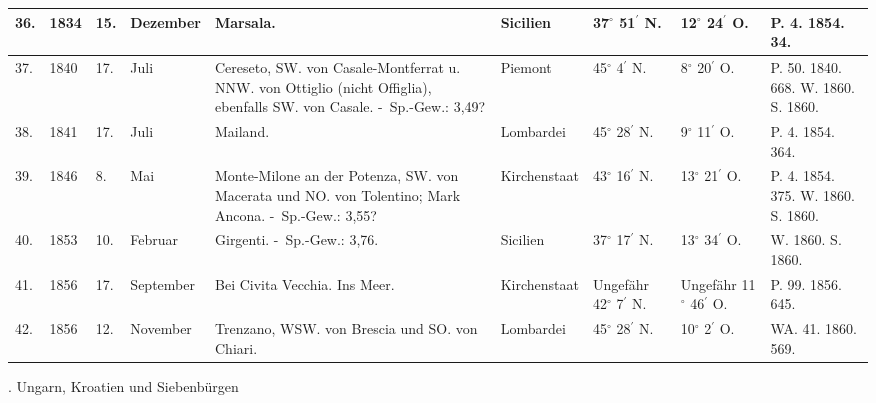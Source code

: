 \documentclass[a4paper, 11pt, oneside, polutonikogreek, german]{article}
\begin{document}
\begin{table}[!ht]
\begin{tabular}{|l|l|l|l|l|l|l|l|l|}
        36. & 1834 & 15. & Dezember & Marsala. & Sicilien & 37$^\circ$ 51$^\prime$ N. & 12$^\circ$ 24$^\prime$ O. & P. 4. 1854. 34. \\ \hline
        37. & 1840 & 17. & Juli & Cereseto, SW. von Casale-Montferrat u. NNW. von Ottiglio (nicht Offiglia), ebenfalls SW. von Casale. - Sp.-Gew.: 3,49? & Piemont & 45$^\circ$ 4$^\prime$ N. & 8$^\circ$ 20$^\prime$ O. & P. 50. 1840. 668. W. 1860. S. 1860. \\ \hline
        38. & 1841 & 17. & Juli & Mailand. & Lombardei & 45$^\circ$ 28$^\prime$ N. & 9$^\circ$ 11$^\prime$ O. & P. 4. 1854. 364. \\ \hline
        39. & 1846 & 8. & Mai & Monte-Milone an der Potenza, SW. von Macerata und NO. von Tolentino; Mark Ancona. - Sp.-Gew.: 3,55? & Kirchenstaat & 43$^\circ$ 16$^\prime$ N. & 13$^\circ$ 21$^\prime$ O. & P. 4. 1854. 375. W. 1860. S. 1860. \\ \hline
        40. & 1853 & 10. & Februar & Girgenti. - Sp.-Gew.: 3,76. & Sicilien & 37$^\circ$ 17$^\prime$ N. & 13$^\circ$ 34$^\prime$ O. & W. 1860. S. 1860. \\ \hline
        41. & 1856 & 17. & September & Bei Civita Vecchia. Ins Meer. & Kirchenstaat & Ungefähr 42$^\circ$ 7$^\prime$ N. & Ungefähr 11$^\circ$ 46$^\prime$ O. & P. 99. 1856. 645. \\ \hline
        42. & 1856 & 12. & November & Trenzano, WSW. von Brescia und SO. von Chiari. & Lombardei & 45$^\circ$ 28$^\prime$ N. & 10$^\circ$ 2$^\prime$ O. & WA. 41. 1860. 569. \\ \hline
    \end{tabular}
\end{table}
. Ungarn, Kroatien und Siebenbürgen
\end{document}
